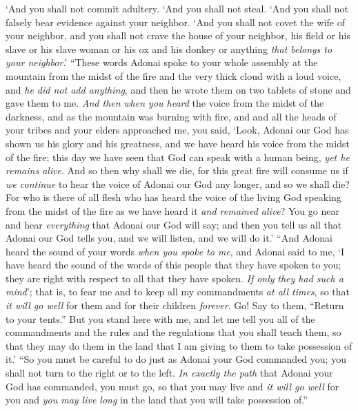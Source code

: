 \begin{biblechapter}
\verse ‘And you shall not commit adultery.
\verse ‘And you shall not steal.
\verse ‘And you shall not falsely bear evidence against your neighbor.
\verse ‘And you shall not covet the wife of your neighbor, and you shall not crave the house of your neighbor, his field or his slave or his slave woman or his ox and his donkey or anything \textit{that belongs to your neighbor}.’
\verse “These words Adonai spoke to your whole assembly at the mountain from the midst of the fire and the very thick cloud with a loud voice, and \textit{he did not add anything}, and then he wrote them on two tablets of stone and gave them to me.
\verse \textit{And then} \textit{when you heard} the voice from the midst of the darkness, and as the mountain was burning with fire, and and all the heads of your tribes and your elders approached me,
\verse you said, ‘Look, Adonai our God has shown us his glory and his greatness, and we have heard his voice from the midst of the fire; this day we have seen that God can speak with a human being, \textit{yet he remains alive}.
\verse And so then why shall we die, for this great fire will consume us if \textit{we continue} to hear the voice of Adonai our God any longer, and so we shall die?
\verse For who is there of all flesh who has heard the voice of the living God speaking from the midst of the fire as we have heard it \textit{and remained alive}?
\verse You go near and hear \textit{everything} that Adonai our God will say; and then you tell us all that Adonai our God tells you, and we will listen, and we will do it.’
\verse “And Adonai heard the sound of your words \textit{when you spoke to me}, and Adonai said to me, ‘I have heard the sound of the words of this people that they have spoken to you; they are right with respect to all that they have spoken.
\verse \textit{If only} \textit{they had such a mind}’; that is, to fear me and to keep all my commandments \textit{at all times}, so that \textit{it will go well} for them and for their children \textit{forever}.
\verse Go! Say to them, “Return to your tents.”
\verse But you stand here with me, and let me tell you all of the commandments and the rules and the regulations that you shall teach them, so that they may do them in the land that I am giving to them to take possession of it.’
\verse “So you must be careful to do just as Adonai your God commanded you; you shall not turn to the right or to the left.
\verse \textit{In exactly the path} that Adonai your God has commanded, you must go, so that you may live and \textit{it will go well} for you and \textit{you may live long} in the land that you will take possession of.”
\end{biblechapter}

